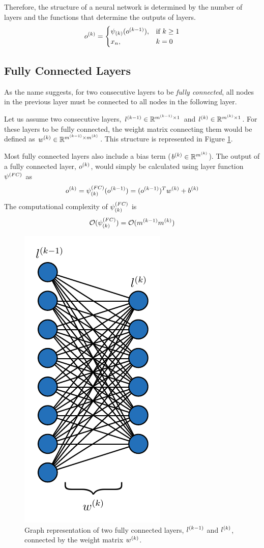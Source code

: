 Therefore, the structure of a neural network is determined by the number of layers and the functions that determine the outputs of layers.
\begin{equation}
\label{eq:output_of_layers}
    o^{(k)} = 
\begin{cases}
    \psi_{(k)}(o^{(k-1)}), &\text{if } k\geq 1\\
    x_{n},& k = 0\\
\end{cases}
\end{equation}


\subsection{Fully Connected Layers}
As the name suggests, for two consecutive layers to be \textit{fully connected}, all nodes in the previous layer must be connected to all nodes in the following layer. 

Let us assume two consecutive layers, $l^{(k-1)} \in \mathbb{R}^{m^{(k-1)} \times 1}$ and $l^{(k)} \in \mathbb{R}^{m^{(k)} \times 1}$. For these layers to be fully connected, the weight matrix connecting them would be defined as $w^{(k)} \in \mathbb{R}^{m^{(k-1)} \times m^{(k)}}$. This structure is represented in Figure  \ref{fig:fully_connected}.

 Most fully connected layers also include a bias term ($b^{(k)} \in  \mathbb{R}^{m^{(k)}}$). The output of a fully connected layer, $o^{(k)}$, would simply be calculated using layer function $\psi^{(FC)}$ as
$$ o^{(k)} = \psi^{(FC)}_{(k)}(o^{(k-1)}) = (o^{(k-1)})^T w^{(k)} + b^{(k)}$$
The computational complexity of $\psi^{(FC)}_{(k)}$ is
$$\mathcal{O}(\psi^{(FC)}_{(k)}) = \mathcal{O}(m^{(k-1)}m^{(k)})$$

\begin{figure}[!h]
  \begin{centering}
    \includegraphics[width=.3\textwidth]{images/fully_connected.pdf}
    \caption{Graph representation of two fully connected layers, $l^{(k-1)}$ and $l^{(k)}$, connected by the weight matrix $w^{(k)}$.}
    \label{fig:fully_connected}
  \end{centering}
\end{figure}

